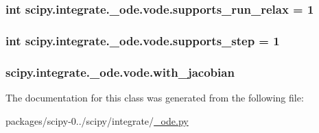 \subsubsection[{supports\+\_\+run\+\_\+relax}]{\setlength{\rightskip}{0pt plus 5cm}int scipy.\+integrate.\+\_\+ode.\+vode.\+supports\+\_\+run\+\_\+relax = 1\hspace{0.3cm}{\ttfamily [static]}}\label{classscipy_1_1integrate_1_1__ode_1_1vode_a9282c0053a951d67715486176c0536a7}
\hypertarget{classscipy_1_1integrate_1_1__ode_1_1vode_a2dc579ce8fe84ffb53a30b7e22aad143}{}
\subsubsection[{supports\+\_\+step}]{\setlength{\rightskip}{0pt plus 5cm}int scipy.\+integrate.\+\_\+ode.\+vode.\+supports\+\_\+step = 1\hspace{0.3cm}{\ttfamily [static]}}\label{classscipy_1_1integrate_1_1__ode_1_1vode_a2dc579ce8fe84ffb53a30b7e22aad143}
\hypertarget{classscipy_1_1integrate_1_1__ode_1_1vode_a975b254785dd0c1dfddf4471310652e7}{}
\subsubsection[{with\+\_\+jacobian}]{\setlength{\rightskip}{0pt plus 5cm}scipy.\+integrate.\+\_\+ode.\+vode.\+with\+\_\+jacobian}\label{classscipy_1_1integrate_1_1__ode_1_1vode_a975b254785dd0c1dfddf4471310652e7}


The documentation for this class was generated from the following file\+:\begin{DoxyCompactItemize}
\item 
packages/scipy-\/0../scipy/integrate/\hyperlink{__ode_8py}{\+\_\+ode.\+py}\end{DoxyCompactItemize}

